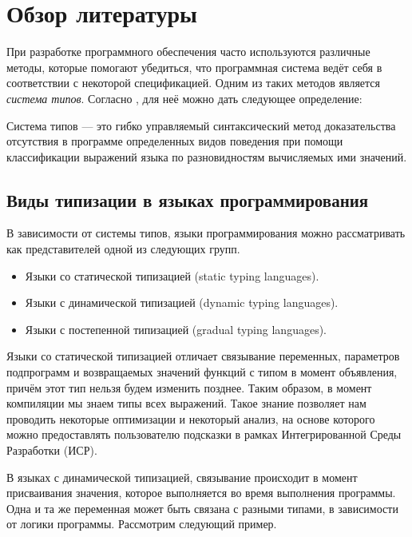 \section{Обзор литературы}

При разработке программного обеспечения часто используются различные методы, которые помогают убедиться, что программная система ведёт себя в соответствии с некоторой спецификацией. Одним из таких методов является \textit{система типов}. Согласно \cite{book:pierce2002types}, для неё можно дать следующее определение:


\begin{definition}
Система типов --- это гибко управляемый синтаксический метод доказательства отсутствия в программе определенных видов поведения при помощи классификации выражений языка по разновидностям вычисляемых ими значений.
\end{definition}


\subsection{Виды типизации в языках программирования}

В зависимости от системы типов, языки программирования можно рассматривать как представителей одной из следующих групп.
\begin{itemize}
\item Языки со статической типизацией (static typing languages).
\item Языки с динамической типизацией (dynamic typing languages).
\item Языки с постепенной типизацией (gradual typing  languages).
\end{itemize}



Языки со статической типизацией отличает связывание переменных, параметров подпрограмм и возвращаемых значений функций с типом в момент объявления, причём этот тип нельзя будем изменить позднее. Таким образом, в момент компиляции мы знаем типы всех выражений. Такое знание позволяет нам проводить некоторые оптимизации и некоторый анализ, на основе которого можно предоставлять пользователю подсказки в рамках Интегрированной Среды Разработки (ИСР).

В языках с динамической типизацией, связывание происходит в момент присваивания значения, которое выполняется во время выполнения программы. Одна и та же переменная может быть связана с разными типами, в зависимости от логики программы. Рассмотрим следующий пример.

